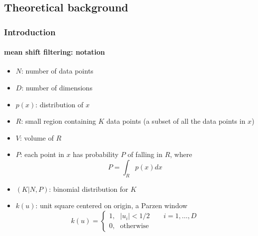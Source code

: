 \subsection{Theoretical background}
\begin{frame}
\frametitle{Introduction}
\framesubtitle{mean shift filtering: notation}
\logoCSIPCPL\mypagenum
	\begin{itemize}
		\item {\color{red}$N$}: number of data points
		\item {\color{red}$D$}: number of dimensions
	 	\item {\color{red}$p(x)$}: distribution of {\color{red}$x$}
		\item {\color{red}$R$}: small region containing {\color{red}$K$} data points (a subset of all the data points in $x$)
		\item {\color{red}$V$}: volume of $R$
		\item {\color{red}$P$}: each point in $x$ has probability $P$ of falling in $R$, where
			\begin{equation*}
				P=\int_R p(x)dx
			\end{equation*}
		\item {\color{red}$(K|N,P)$}: binomial distribution for $K$
		\item {\color{red} $k(u)$}: unit square centered on origin, a Parzen window
			\begin{equation*}
				k(u) = 
				\left\{ 
				\begin{array}{rl}
					1\text{,} &  |u_i|<1/2 \ \ \ \ \ \ \ \ \ i=1,\ldots, D\\ 
					0\text{,} &  \mbox{otherwise}
				\end{array}
				\right.
			\end{equation*}
	\end{itemize}
\end{frame}




